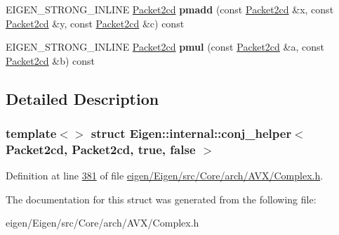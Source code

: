 \begin{DoxyCompactItemize}
E\+I\+G\+E\+N\+\_\+\+S\+T\+R\+O\+N\+G\+\_\+\+I\+N\+L\+I\+NE \hyperlink{struct_eigen_1_1internal_1_1_packet2cd}{Packet2cd} {\bfseries pmadd} (const \hyperlink{struct_eigen_1_1internal_1_1_packet2cd}{Packet2cd} \&x, const \hyperlink{struct_eigen_1_1internal_1_1_packet2cd}{Packet2cd} \&y, const \hyperlink{struct_eigen_1_1internal_1_1_packet2cd}{Packet2cd} \&c) const
\item 
\mbox{\label{struct_eigen_1_1internal_1_1conj__helper_3_01_packet2cd_00_01_packet2cd_00_01true_00_01false_01_4_ae350a7a68057b0ecabe9cbb3cba29737}} 
E\+I\+G\+E\+N\+\_\+\+S\+T\+R\+O\+N\+G\+\_\+\+I\+N\+L\+I\+NE \hyperlink{struct_eigen_1_1internal_1_1_packet2cd}{Packet2cd} {\bfseries pmul} (const \hyperlink{struct_eigen_1_1internal_1_1_packet2cd}{Packet2cd} \&a, const \hyperlink{struct_eigen_1_1internal_1_1_packet2cd}{Packet2cd} \&b) const
\end{DoxyCompactItemize}


\subsection{Detailed Description}
\subsubsection*{template$<$$>$\newline
struct Eigen\+::internal\+::conj\+\_\+helper$<$ Packet2cd, Packet2cd, true, false $>$}



Definition at line \hyperlink{eigen_2_eigen_2src_2_core_2arch_2_a_v_x_2_complex_8h_source_l00381}{381} of file \hyperlink{eigen_2_eigen_2src_2_core_2arch_2_a_v_x_2_complex_8h_source}{eigen/\+Eigen/src/\+Core/arch/\+A\+V\+X/\+Complex.\+h}.



The documentation for this struct was generated from the following file\+:\begin{DoxyCompactItemize}
\item 
eigen/\+Eigen/src/\+Core/arch/\+A\+V\+X/\+Complex.\+h\end{DoxyCompactItemize}
